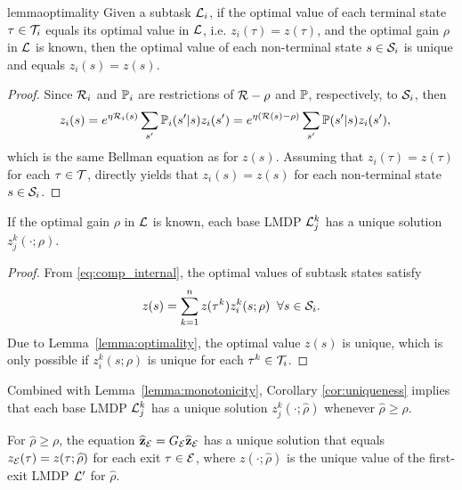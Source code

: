 \begin{restatable}{lemma}{optimality}
Given a subtask $\mathcal{L}_i$, if the optimal value of each terminal state $\tau\in\mathcal{T}_i$ equals its optimal value in $\mathcal{L}$, i.e. $z_i(\tau) = z(\tau)$, and the optimal gain $\rho$ in $\mathcal{L}$ is known, then the optimal value of each non-terminal state $s\in\mathcal{S}_i$ is unique and equals $z_i(s)=z(s)$.
    \label{lemma:optimality}
\end{restatable}

\begin{proof} Since $\mathcal{R}_i$ and $\mathbb{P}_i$ are restrictions of $\mathcal{R}-\rho$ and $\mathbb{P}$, respectively, to $\mathcal{S}_i$, then
\begin{align*}
    z_i(s) &= e^{\eta\mathcal{R}_i(s)}\sum_{s'}\mathbb{P}_i(s'\lvert s) z_i(s') = e^{\eta(\mathcal{R}(s) - \rho)}\sum_{s'}\mathbb{P}(s'\lvert s) z_i(s'), \nonumber
\end{align*}
which is the same Bellman equation as for $z(s)$. Assuming that $z_i(\tau) = z(\tau)$ for each $\tau\in\mathcal{T}$, directly yields that $z_i(s)=z(s)$ for each non-terminal state $s\in\mathcal{S}_i$.
\end{proof}

\begin{corollary}\label{cor:uniqueness}
    If the optimal gain $\rho$ in $\mathcal{L}$ is known, each base LMDP $\mathcal{L}_j^k$ has a unique solution $z_j^k(\cdot;\rho)$.
\end{corollary}

\begin{proof} From \eqref{eq:comp_internal}, the optimal values of subtask states satisfy
\[
  z(s) = \sum_{k=1}^n z(\tau^k) z_i^k(s;\rho)\;\;\forall s\in\mathcal{S}_i.
\]
Due to Lemma~\ref{lemma:optimality}, the optimal value $z(s)$ is unique, which is only possible if $z_i^k(s;\rho)$ is unique for each $\tau^k\in\mathcal{T}_i$.
\end{proof}

Combined with Lemma~\ref{lemma:monotonicity}, Corollary \ref{cor:uniqueness} implies that each base LMDP $\mathcal{L}_j^k$ has a unique solution $z_j^k(\cdot;\widehat\rho)$ whenever $\widehat\rho\geq\rho$.

\begin{lemma}
For $\widehat\rho\geq\rho$, the equation ${\bf \widehat z_{\mathcal{E}}} = G_{\mathcal{E}} {\bf\widehat z_{\mathcal{E}}}$ has a unique solution that equals $z_{\mathcal{E}}(\tau)=z(\tau;\widehat\rho)$ for each exit $\tau\in\mathcal{E}$, where $z(\cdot;\widehat\rho)$ is the unique value of the first-exit LMDP $\mathcal{L}'$ for $\widehat\rho$.
\end{lemma}

